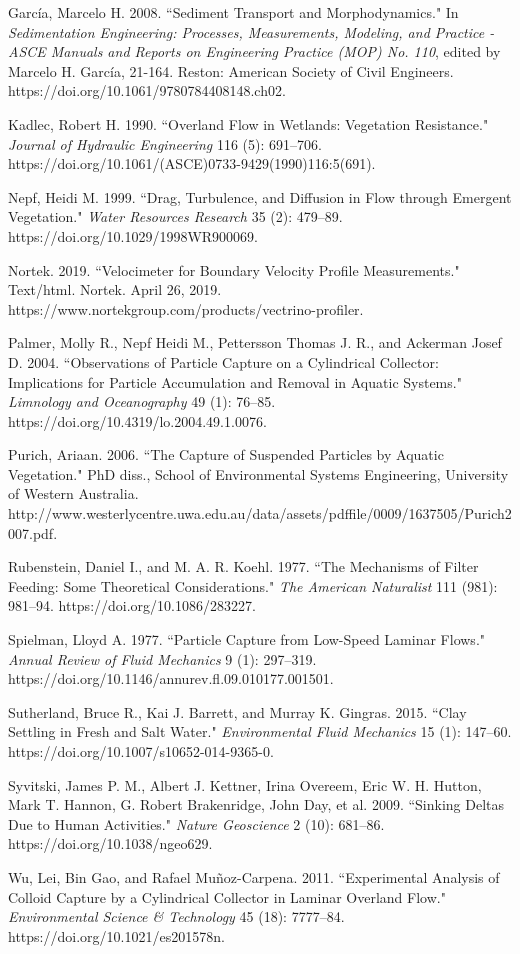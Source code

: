 \documentclass[12pt]{article}
\begin{document}
\begin{thebibliography}{20}
García, Marcelo H. 2008. ``Sediment Transport and Morphodynamics." In \textit{Sedimentation Engineering: Processes, Measurements, Modeling, and Practice - ASCE Manuals and Reports on Engineering Practice (MOP) No. 110}, edited by Marcelo H. García, 21-164. Reston: American Society of Civil Engineers. https://doi.org/10.1061/9780784408148.ch02.

Kadlec, Robert H. 1990. ``Overland Flow in Wetlands: Vegetation Resistance." \textit{Journal of Hydraulic Engineering} 116 (5): 691–706. https://doi.org/10.1061/(ASCE)0733-9429(1990)116:5(691).

Nepf, Heidi M. 1999. ``Drag, Turbulence, and Diffusion in Flow through Emergent Vegetation." \textit{Water Resources Research} 35 (2): 479–89. https://doi.org/10.1029/1998WR900069.

Nortek. 2019. ``Velocimeter for Boundary Velocity Profile Measurements." Text/html. Nortek. April 26, 2019. https://www.nortekgroup.com/products/vectrino-profiler.

Palmer, Molly R., Nepf Heidi M., Pettersson Thomas J. R., and Ackerman Josef D. 2004. ``Observations of Particle Capture on a Cylindrical Collector: Implications for Particle Accumulation and Removal in Aquatic Systems." \textit{Limnology and Oceanography} 49 (1): 76–85. https://doi.org/10.4319/lo.2004.49.1.0076.

Purich, Ariaan. 2006. ``The Capture of Suspended Particles by Aquatic Vegetation." PhD diss., School of Environmental Systems Engineering, University of Western Australia. http://www.westerlycentre.uwa.edu.au/\textunderscore \textunderscore data/assets/pdf\textunderscore file/0009/1637505/Purich\textunderscore 2007.pdf.

Rubenstein, Daniel I., and M. A. R. Koehl. 1977. ``The Mechanisms of Filter Feeding: Some Theoretical Considerations." \textit{The American Naturalist} 111 (981): 981–94. https://doi.org/10.1086/283227.

Spielman, Lloyd A. 1977. ``Particle Capture from Low-Speed Laminar Flows." \textit{Annual Review of Fluid Mechanics} 9 (1): 297–319. https://doi.org/10.1146/annurev.fl.09.010177.001501.

Sutherland, Bruce R., Kai J. Barrett, and Murray K. Gingras. 2015. ``Clay Settling in Fresh and Salt Water." \textit{Environmental Fluid Mechanics} 15 (1): 147–60. https://doi.org/10.1007/s10652-014-9365-0.

Syvitski, James P. M., Albert J. Kettner, Irina Overeem, Eric W. H. Hutton, Mark T. Hannon, G. Robert Brakenridge, John Day, et al. 2009. ``Sinking Deltas Due to Human Activities." \textit{Nature Geoscience} 2 (10): 681–86. https://doi.org/10.1038/ngeo629.

Wu, Lei, Bin Gao, and Rafael Muñoz-Carpena. 2011. ``Experimental Analysis of Colloid Capture by a Cylindrical Collector in Laminar Overland Flow." \textit{Environmental Science \& Technology} 45 (18): 7777–84. https://doi.org/10.1021/es201578n.

\end{thebibliography}
\end{document}

